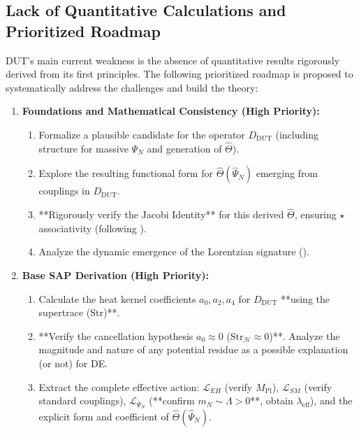 \documentclass[11pt, a4paper]{article}
\theoremstyle{remark}
\newcommand{\Op}[1]{\hat{#1}}
\newcommand{\Star}{\star}
\newcommand{\Str}{\mathrm{Str}}
\begin{document}
\subsection{Lack of Quantitative Calculations and Prioritized Roadmap }
\label{subsec:quantitative_roadmap_detailed}

DUT's main current weakness is the absence of quantitative results rigorously derived from its first principles. The following prioritized roadmap is proposed to systematically address the challenges and build the theory:

\begin{enumerate}[label=\textbf{Phase \arabic*}:, wide, labelwidth=!, labelindent=0pt, itemsep=2pt, topsep=3pt]
    \item \textbf{Foundations and Mathematical Consistency (High Priority):}
        \begin{enumerate}[label=\alph*), itemsep=1pt]
            \item Formalize a plausible candidate for the operator \( D_{\text{DUT}} \) (including structure for massive \( \Psi_N \) and generation of \( \Op{\Theta} \)).
            \item Explore the resulting functional form for \( \Op{\Theta}(\Op{\Psi}_N) \) emerging from couplings in \( D_{\text{DUT}} \).
            \item **Rigorously verify the Jacobi Identity** for this derived \( \Op{\Theta} \), ensuring \( \Star \) associativity (following ).
            \item Analyze the dynamic emergence of the Lorentzian signature ().
        \end{enumerate}
    \item \textbf{Base SAP Derivation (High Priority):}
        \begin{enumerate}[label=\alph*), itemsep=1pt]
            \item Calculate the heat kernel coefficients \( a_0, a_2, a_4 \) for \( D_{\text{DUT}} \) **using the supertrace (\( \Str \))**.
            \item **Verify the cancellation hypothesis \( a_0 \approx 0 \) (\( \Str_{\mathcal{H}} \approx 0 \))**. Analyze the magnitude and nature of any potential residue as a possible explanation (or not) for DE.
            \item Extract the complete effective action: \( \mathcal{L}_{EH} \) (verify \( M_{\text{Pl}} \)), \( \mathcal{L}_{SM} \) (verify standard couplings), \( \mathcal{L}_{\Psi_N} \) (**confirm \( m_N \sim \Lambda > 0 \)**, obtain \( \lambda_{\text{eff}} \)), and the explicit form and coefficient of \( \Op{\Theta}(\Op{\Psi}_N) \).

\end{enumerate}
\end{enumerate}
\end{document}
